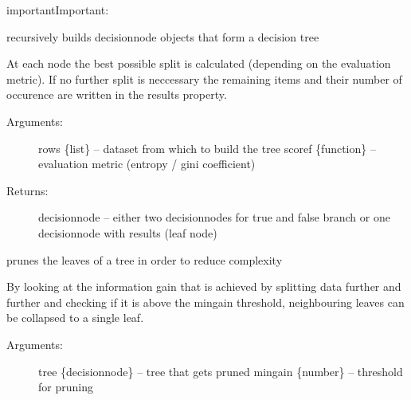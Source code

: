 \documentclass[letterpaper,10pt,english]{sphinxmanual}
\begin{document}
\begin{sphinxadmonition}{important}{Important:}
\begin{fulllineitems}
\end{fulllineitems}

\label{\detokenize{DT:buildtree}}

\begin{fulllineitems}
\label{\detokenize{DT:ForestFire.Main.buildtree}}
recursively builds decisionnode objects that form a decision tree

At each node the best possible split is calculated (depending on the evaluation metric).
If no further split is neccessary the remaining items and their number of occurence
are written in the results property.
\begin{description}
\item[{Arguments:}] \leavevmode
rows \{list\} -- dataset from which to build the tree
scoref \{function\} -- evaluation metric (entropy / gini coefficient)

\item[{Returns:}] \leavevmode
decisionnode -- either two decisionnodes for true and false branch or one decisionnode with results (leaf node)

\end{description}

\end{fulllineitems}

\label{\detokenize{DT:prune}}

\begin{fulllineitems}
\label{\detokenize{DT:ForestFire.Main.prune}}
prunes the leaves of a tree in order to reduce complexity

By looking at the information gain that is achieved by splitting data further and further and checking if
it is above the mingain threshold, neighbouring leaves can be collapsed to a single leaf.
\begin{description}
\item[{Arguments:}] \leavevmode
tree \{decisionnode\} -- tree that gets pruned
mingain \{number\} -- threshold for pruning

\end{description}

\end{fulllineitems}


\end{sphinxadmonition}
\end{document}
